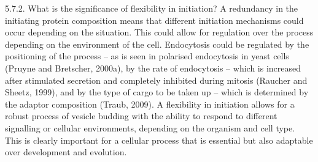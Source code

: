 \vspace{2mm}
5.7.2. What is the significance of flexibility in initiation? 
A redundancy in the initiating protein composition means that different initiation mechanisms could occur depending on the situation. This could allow for regulation over the process depending on the environment of the cell. Endocytosis could be regulated by the positioning of the process – as is seen in polarised endocytosis in yeast cells (Pruyne and Bretscher, 2000a), by the rate of endocytosis – which is increased after stimulated secretion and completely inhibited during mitosis (Raucher and Sheetz, 1999), and by the type of cargo to be taken up – which is determined by the adaptor composition (Traub, 2009). A flexibility in initiation allows for a robust process of vesicle budding with the ability to respond to different signalling or cellular environments, depending on the organism and cell type. This is clearly important for a cellular process that is essential but also adaptable over development and evolution. 
